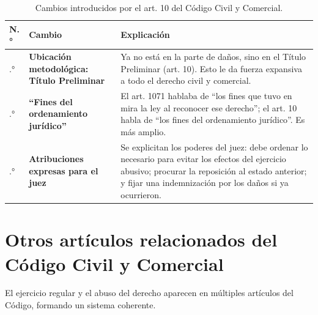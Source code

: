 \documentclass[12pt,oneside]{book}
\begin{document}
\begin{table}[H]
\centering
\begin{tabularx}{\textwidth}{
    >{\centering\arraybackslash}p{1cm}
    >{\raggedright\arraybackslash}p{4.2cm}
    >{\raggedright\arraybackslash}X
}
\toprule
\textbf{N.°} & \textbf{Cambio} & \textbf{Explicación} \\
\midrule
1.° & \textbf{Ubicación metodológica: Título Preliminar} & Ya no está en la parte de daños, sino en el Título Preliminar (art. 10). Esto le da fuerza expansiva a todo el derecho civil y comercial. \\
\addlinespace
2.° & \textbf{``Fines del ordenamiento jurídico''} & El art. 1071 hablaba de ``los fines que tuvo en mira la ley al reconocer ese derecho''; el art. 10 habla de ``los fines del ordenamiento jurídico''. Es más amplio. \\
\addlinespace
3.° & \textbf{Atribuciones expresas para el juez} & Se explicitan los poderes del juez: debe ordenar lo necesario para evitar los efectos del ejercicio abusivo; procurar la reposición al estado anterior; y fijar una indemnización por los daños si ya ocurrieron. \\
\bottomrule
\end{tabularx}
\caption{Cambios introducidos por el art. 10 del Código Civil y Comercial.}
\end{table}

\section{Otros artículos relacionados del Código Civil y Comercial}

El ejercicio regular y el abuso del derecho aparecen en múltiples artículos del Código, formando un sistema coherente.
\end{document}
